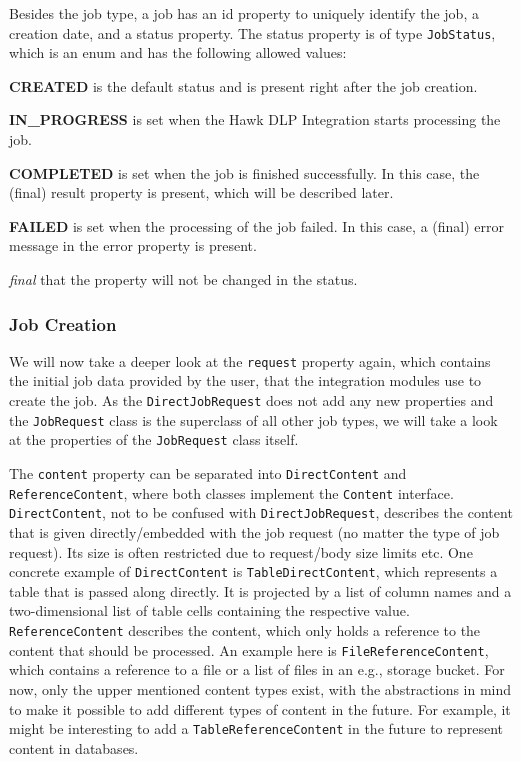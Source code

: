 Besides the job type, a job has an id property to uniquely identify the job, a creation date, and a status property. The status property is of type \texttt{JobStatus}, which is an enum and has the following allowed values: 

\textbf{CREATED} is the default status and is present right after the job creation.

\textbf{IN\_PROGRESS} is set when the Hawk DLP Integration starts processing the job.

\textbf{COMPLETED} is set when the job is finished successfully. In this case, the (final) result property is present, which will be described later.

\textbf{FAILED} is set when the processing of the job failed. In this case, a (final) error message in the error property is present.

\textit{final} that the property will not be changed in the status.

\subsubsection{Job Creation}

We will now take a deeper look at the \texttt{request} property again, which contains the initial job data provided by the user, that the integration modules use to create the job.
As the \texttt{DirectJobRequest} does not add any new properties and the \texttt{JobRequest} class is the superclass of all other job types, we will take a look at the properties of the \texttt{JobRequest} class itself.

The \texttt{content} property can be separated into \texttt{DirectContent} and \texttt{ReferenceContent}, where both classes implement the \texttt{Content} interface. \texttt{DirectContent}, not to be confused with \texttt{DirectJobRequest}, describes the content that is given directly/embedded with the job request (no matter the type of job request). Its size is often restricted due to request/body size limits etc. One concrete example of \texttt{DirectContent} is \texttt{TableDirectContent}, which represents a table that is passed along directly. It is projected by a list of column names and a two-dimensional list of table cells containing the respective value. \texttt{ReferenceContent} describes the content, which only holds a reference to the content that should be processed. An example here is \texttt{FileReferenceContent}, which contains a reference to a file or a list of files in an e.g., storage bucket.
For now, only the upper mentioned content types exist, with the abstractions in mind to make it possible to add different types of content in the future. For example, it might be interesting to add a \texttt{TableReferenceContent} in the future to represent content in databases.

